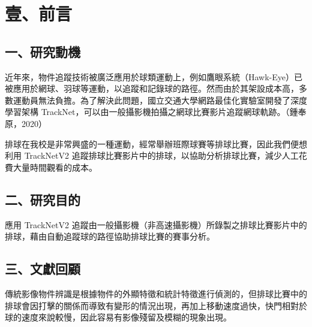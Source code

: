 \section{壹、前言}

\subsection{一、研究動機}

近年來，物件追蹤技術被廣泛應用於球類運動上，例如鷹眼系統（Hawk-Eye）已被應用於網球、羽球等運動，以追蹤和記錄球的路徑。然而由於其架設成本高，多數運動員無法負擔。為了解決此問題，國立交通大學網路最佳化實驗室開發了深度學習架構 TrackNet，可以由一般攝影機拍攝之網球比賽影片追蹤網球軌跡。（鍾奉原，2020）

排球在我校是非常興盛的一種運動，經常舉辦班際球賽等排球比賽，因此我們便想利用 TrackNetV2 追蹤排球比賽影片中的排球，以協助分析排球比賽，減少人工花費大量時間觀看的成本。

\subsection{二、研究目的}

應用 TrackNetV2 追蹤由一般攝影機（非高速攝影機）所錄製之排球比賽影片中的排球，藉由自動追蹤球的路徑協助排球比賽的賽事分析。

\subsection{三、文獻回顧}

傳統影像物件辨識是根據物件的外顯特徵和統計特徵進行偵測的，但排球比賽中的排球會因打擊的關係而導致有變形的情況出現，再加上移動速度過快，快門相對於球的速度來說較慢，因此容易有影像殘留及模糊的現象出現。

